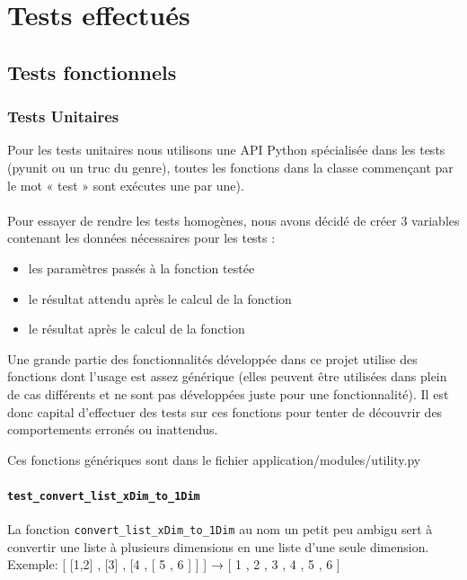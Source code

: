\documentclass[16pts]{report}
\begin{document}
\chapter{Tests effectués}
\label{cha:Tests}
    \section{Tests fonctionnels}
    \label{sec:Tests fonctionnels}

\subsection{Tests Unitaires}

Pour les tests unitaires nous utilisons une API Python spécialisée dans les 
tests (pyunit ou un truc du genre), toutes les fonctions dans la classe 
commençant par le mot « test » sont exécutes une par une).\\
\\
Pour essayer de rendre les tests homogènes, nous avons décidé de créer 3 
variables contenant les données nécessaires pour les tests :\\

\begin{itemize}
    \item les paramètres passés à la fonction testée
    \item le résultat attendu après le calcul de la fonction
    \item le résultat après le calcul de la fonction
\end{itemize}

Une grande partie des fonctionnalités développée dans ce projet utilise 
des fonctions dont l'usage est assez générique (elles peuvent être utilisées
dans plein de cas différents et ne sont pas développées juste pour une 
fonctionnalité). Il est donc capital d'effectuer des tests sur ces fonctions
pour tenter de découvrir des comportements erronés ou inattendus.

Ces fonctions génériques sont dans le fichier application/modules/utility.py

\subsubsection{\texttt{test\_convert\_list\_xDim\_to\_1Dim}}

La fonction \verb|convert_list_xDim_to_1Dim| au nom un petit peu ambigu sert à 
convertir une liste à plusieurs dimensions en une liste d'une seule dimension.
\\
Exemple: [ [1,2] , [3] , [4 , [ 5 , 6 ] ] ] → [ 1 , 2 , 3 , 4 , 5 , 6 ]\\
\end{document}
